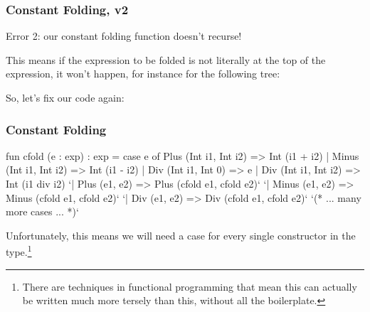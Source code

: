 \documentclass[aspectratio=169, handout]{beamer}
\begin{document}
\begin{frame}[fragile]
  \frametitle{Constant Folding, v2}

  Error 2: our constant folding function doesn't recurse!

  \pause
  \vspace{\fill}

  This means if the expression to be folded is not literally at the top
  of the expression, it won't happen, for instance for the following tree:

  \begin{center}
  \end{center}

  \pause
  \vspace{\fill}

  So, let's fix our code again:
\end{frame}

\begin{frame}[fragile]
  \frametitle{Constant Folding}

  {\small
  \begin{codeblock}
    fun cfold (e : exp) : exp =
      case e of
        Plus  (Int i1, Int i2) => Int (i1 + i2)
      | Minus (Int i1, Int i2) => Int (i1 - i2)
      | Div   (Int i1, Int 0)  => e
      | Div   (Int i1, Int i2) => Int (i1 div i2)
      `| Plus  (e1, e2) => Plus  (cfold e1, cfold e2)`
      `| Minus (e1, e2) => Minus (cfold e1, cfold e2)`
      `| Div   (e1, e2) => Div   (cfold e1, cfold e2)`
      `(* ... many more cases ... *)`
  \end{codeblock}
  }

  \pause
  \vspace{\fill}

  Unfortunately, this means we will need a case for every single
  constructor in the  type.\footnote<2->{There are techniques in
  functional programming that mean this can actually be written much more
  tersely than this, without all the boilerplate.}
\end{frame}
\end{document}
